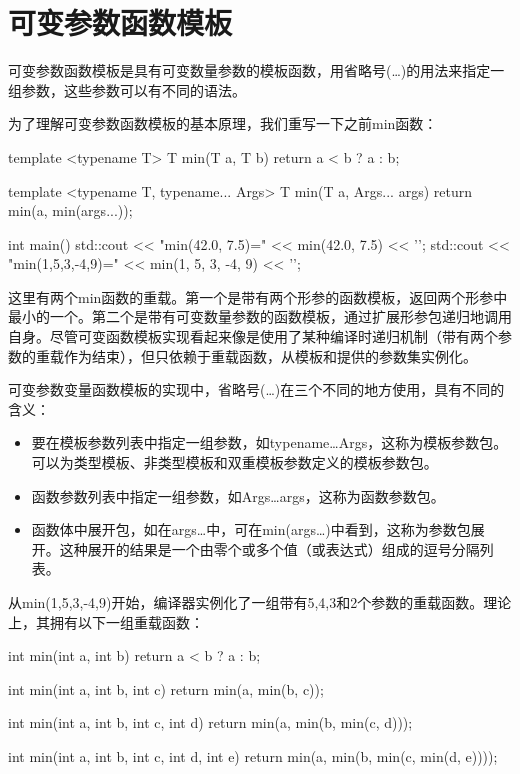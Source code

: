 \section{可变参数函数模板}
可变参数函数模板是具有可变数量参数的模板函数，用省略号(…)的用法来指定一组参数，这些参数可以有不同的语法。

为了理解可变参数函数模板的基本原理，我们重写一下之前min函数：

\begin{cpp}
template <typename T>
T min(T a, T b)
{
	return a < b ? a : b;
}

template <typename T, typename... Args>
T min(T a, Args... args)
{
	return min(a, min(args...));
}

int main()
{
	std::cout << "min(42.0, 7.5)=" << min(42.0, 7.5)
	          << '\n';
	std::cout << "min(1,5,3,-4,9)=" << min(1, 5, 3, -4, 9)
	          << '\n';
}
\end{cpp}

这里有两个min函数的重载。第一个是带有两个形参的函数模板，返回两个形参中最小的一个。第二个是带有可变数量参数的函数模板，通过扩展形参包递归地调用自身。尽管可变函数模板实现看起来像是使用了某种编译时递归机制（带有两个参数的重载作为结束），但只依赖于重载函数，从模板和提供的参数集实例化。

可变参数变量函数模板的实现中，省略号(…)在三个不同的地方使用，具有不同的含义：

\begin{itemize}
\item
要在模板参数列表中指定一组参数，如typename…Args，这称为模板参数包。可以为类型模板、非类型模板和双重模板参数定义的模板参数包。

\item
函数参数列表中指定一组参数，如Args…args，这称为函数参数包。

\item
函数体中展开包，如在args…中，可在min(args…)中看到，这称为参数包展开。这种展开的结果是一个由零个或多个值（或表达式）组成的逗号分隔列表。
\end{itemize}

从min(1,5,3,-4,9)开始，编译器实例化了一组带有5,4,3和2个参数的重载函数。理论上，其拥有以下一组重载函数：

\begin{cpp}
int min(int a, int b)
{
	return a < b ? a : b;
}

int min(int a, int b, int c)
{
	return min(a, min(b, c));
}

int min(int a, int b, int c, int d)
{
	return min(a, min(b, min(c, d)));
}

int min(int a, int b, int c, int d, int e)
{
	return min(a, min(b, min(c, min(d, e))));
}
\end{cpp}

